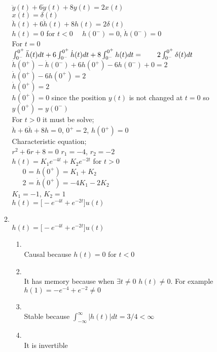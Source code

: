 \documentclass[10pt,a4paper, margin=1in]{article}
\begin{document}
\begin{enumerate}
\begin{enumerate}
    $\ddot{y}(t)+6\dot{y}(t)+8y(t)=2x(t)$\\
    $x(t)=\delta(t)$\\
    $\ddot{h}(t)+6\dot{h}(t)+8h(t)=2\delta(t)$\\
    $h(t)=0 $ for $t<0$ \qquad \ \ $h(0^-)=0$, $\dot{h}(0^-)=0$\\
    For $t=0$\\
    \null \qquad $\int_{0^-}^{0^+}\ddot{h}(t)dt + 6 \int_{0^-}^{0^+}\dot{h}(t)dt + 8 \int_{0^-}^{0^+}h(t)dt = \null \qquad 2\int_{0^-}^{0^+}\delta(t)dt$\\
    \null \qquad $\dot{h}(0^+)-\dot{h}(0^-) + 6h(0^+)-6h(0^-)+0=2$\\
    \null \qquad $\dot{h}(0^+) - 6h(0^+) = 2 $\\
    \null \qquad $\dot{h}(0^+)=2$\\
   \null \qquad  $h(0^+) =0$ since the position $y(t)$ is not changed at $t=0$ so $y(0^+)=y(0^-)$\\
   For $t>0$ it must be solve;\\
   \null \qquad $ \ddot{h}+6 \dot{h}+8h=0$, $\dot{0^+}=2$, $h(0^+)=0$\\
   \null \qquad Characteristic equation;\\
   \null \qquad \qquad $r^2+6r+8=0$ \qquad $r_1=-4$, $r_2=-2$\\
   \null \qquad $h(t)=K_1e^{-4t}+K_2e^{-2t}$ \qquad for $ t> 0$\\
   \null \qquad\ \ \  0 = $h(0^+) = K_1 + K_2$\\
    \null \qquad\ \ \  2 = $\dot{h}(0^+)=-4K_1-2K_2$\\
     \null \qquad $K_1=-1$, $K_2=1$\\
     $h(t)=\Big[-e^{-4t}+e^{-2t}\Big] u(t)$
    
    \item %
    \ \\
    $h(t)=\Big[-e^{-4t}+e^{-2t}\Big] u(t)$
    	\begin{enumerate}
    		\item %
    		\ \\
    		Causal because $h(t)=0$ for $t<0$\\
    		\item %
    		\ \\
    		It has memory because when $\exists t \ne 0$ $ h(t) \ne 0$. For example $h(1)=-e^{-4}+e^{-2} \ne 0$
    		\item %
    		\ \\
    		Stable because $\int_{-\infty}^{\infty}|h(t)|dt=3/4 < \infty$
    		\item %
    		\ \\
    		It is invertible
		\end{enumerate}
    \end{enumerate}



\end{enumerate}
\end{document}

